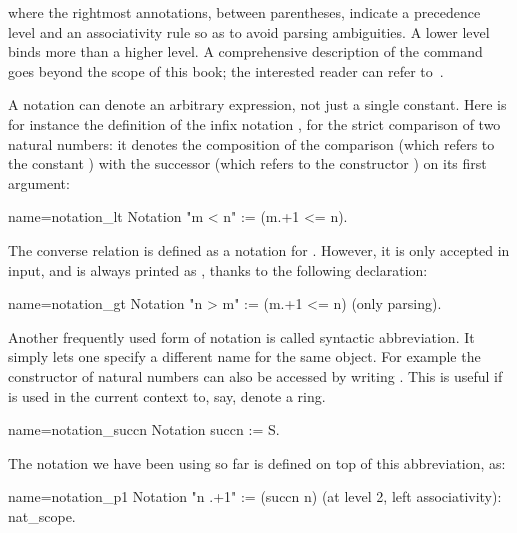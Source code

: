 where the rightmost annotations, between parentheses, indicate a
precedence level and an associativity rule so as to avoid parsing
ambiguities. A lower level binds more than a higher level. A comprehensive
description of the  command goes beyond the scope of this
book; the interested reader can refer to~\cite[``Syntax extensions and interpretation scopes'']{Coq:manual}.

A notation can denote an arbitrary expression, not just a
single constant. Here is for instance the definition of the infix
notation \C{<}, for the strict comparison of two natural numbers: it
denotes the composition of the comparison \C{_ <= _}
(which refers to the constant ) with the successor 
(which refers to the constructor ) on its first argument:

\begin{coq}{name=notation_lt}{}
Notation "m < n"  := (m.+1 <= n).
\end{coq}


The converse relation  is defined as a notation for
. However, it is only accepted in input,
and is always printed as  , thanks to the following declaration:

\begin{coq}{name=notation_gt}{}
Notation "n > m"  := (m.+1 <= n) (only parsing).
\end{coq}

Another frequently used form of notation is called syntactic abbreviation.
It simply lets one specify a different name for the same object.
For example the  constructor of natural numbers can also be accessed
by writing .  This is useful if  is used in the current context
to, say, denote a ring.

\begin{coq}{name=notation_succn}{}
Notation succn := S.
\end{coq}

The notation  we have been using so far is defined on top of
this abbreviation, as:

\begin{coq}{name=notation_p1}{}
Notation "n .+1" := (succn n) (at level 2, left associativity): nat_scope.
\end{coq}


